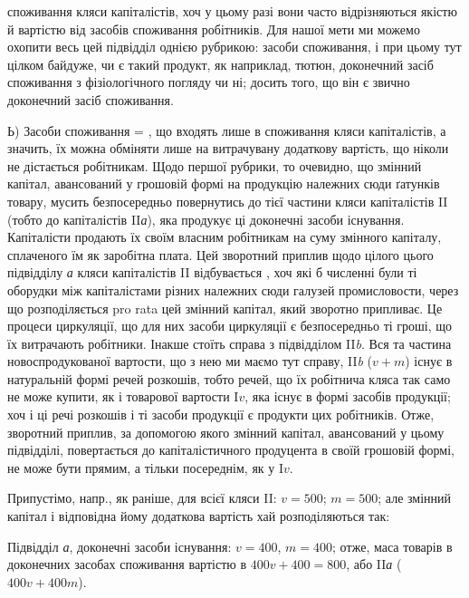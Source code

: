 \parcont{}  %
споживання кляси капіталістів, хоч у цьому разі вони часто відрізняються
якістю й вартістю від засобів споживання робітників. Для нашої мети
ми можемо охопити весь цей підвідділ однією рубрикою: 
засоби споживання, і при цьому тут цілком байдуже, чи є такий продукт,
як наприклад, тютюн, доконечний засіб споживання з фізіологічного
погляду чи ні; досить того, що він є звично доконечний засіб споживання.

Ь) Засоби споживання = , що входять лише в
споживання кляси капіталістів, а значить, їх можна обміняти лише на
витрачувану додаткову вартість, що ніколи не дістається робітникам.
Щодо першої рубрики, то очевидно, що змінний капітал, авансований у
грошовій формі на продукцію належних сюди ґатунків товару, мусить
безпосередньо повернутись до тієї частини кляси капіталістів II (тобто
до капіталістів II\emph{а}), яка продукує ці доконечні засоби існування. Капіталісти
продають їх своїм власним робітникам на суму змінного капіталу,
сплаченого їм як заробітна плата. Цей зворотний приплив щодо цілого
цього підвідділу \emph{а} кляси капіталістів II відбувається ,
хоч які б численні були ті оборудки між капіталістами різних належних
сюди галузей промисловости, через що розподіляється pro rata
цей змінний капітал, який зворотно припливає. Це процеси циркуляції,
що для них засоби циркуляції є безпосередньо ті гроші, що їх витрачають
робітники. Інакше стоїть справа з підвідділом II\emph{b}. Вся та частина
новоспродукованої вартости, що з нею ми маємо тут справу, II\emph{b} ($v + m$)
існує в натуральній формі речей розкошів, тобто речей, що їх робітнича
кляса так само не може купити, як і товарової вартости I$v$, яка існує
в формі засобів продукції; хоч і ці речі розкошів і ті засоби продукції
є продукти цих робітників. Отже, зворотний приплив, за допомогою
якого змінний капітал, авансований у цьому підвідділі, повертається до
капіталістичного продуцента в своїй грошовій формі, не може бути
прямим, а тільки посереднім, як у I$v$.

Припустімо, напр., як раніше, для всієї кляси II: $v = 500$; $m = 500$;
але змінний капітал і відповідна йому додаткова вартість хай розподіляються
так:

Підвідділ \emph{а}, доконечні засоби існування: $v = 400$, $m = 400$; отже,
маса товарів в доконечних засобах споживання вартістю в $400 v + 400 = 800$,
або II\emph{а} ($400 v + 400 m$).

